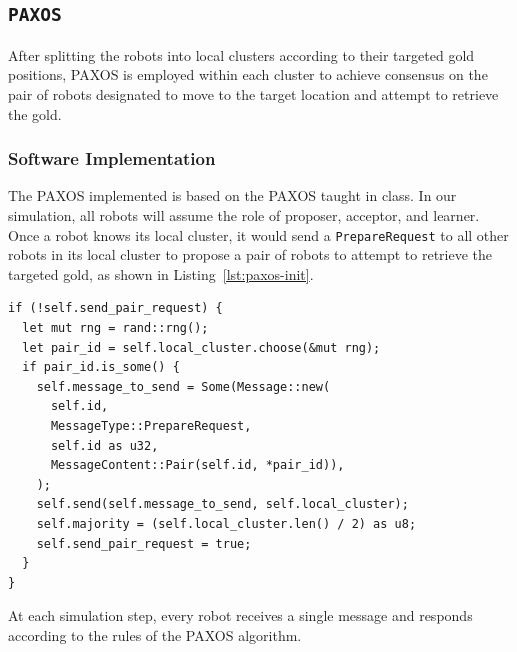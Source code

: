 \documentclass[12pt,a4paper]{article}
\begin{document}
\subsection{\texttt{PAXOS}}
After splitting the robots into local clusters according to their targeted gold positions, PAXOS is employed within each cluster to achieve consensus on the pair of robots designated to move to the target location and attempt to retrieve the gold.

\subsubsection{Software Implementation}
The PAXOS implemented is based on the PAXOS taught in class. In our simulation, all robots will assume the role of proposer, acceptor, and learner. Once a robot knows its local cluster, it would send a \texttt{PrepareRequest} to all other robots in its local cluster to propose a pair of robots to attempt to retrieve the targeted gold, as shown in Listing~\ref{lst:paxos-init}.
\begin{lstlisting}[float, caption={Robot Sends a \texttt{PrepareRequest} to Propose a Robot Pairing}, label={lst:paxos-init}]
if (!self.send_pair_request) {
  let mut rng = rand::rng();
  let pair_id = self.local_cluster.choose(&mut rng);
  if pair_id.is_some() {
    self.message_to_send = Some(Message::new(
      self.id,
      MessageType::PrepareRequest,
      self.id as u32,
      MessageContent::Pair(self.id, *pair_id)),
    );
    self.send(self.message_to_send, self.local_cluster);
    self.majority = (self.local_cluster.len() / 2) as u8;
    self.send_pair_request = true;
  }
}
\end{lstlisting}
At each simulation step, every robot receives a single message and responds according to the rules of the PAXOS algorithm. 
\end{document}
